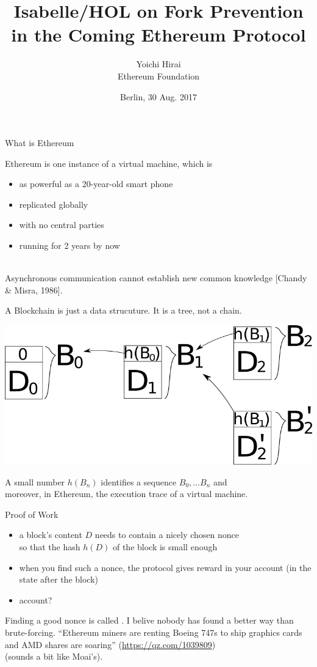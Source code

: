 \documentclass{beamer}
\title{Isabelle/HOL on Fork Prevention\\ in the Coming Ethereum Protocol}
\author{Yoichi Hirai\\ {\small Ethereum Foundation}}
\date{Berlin, 30 Aug. 2017}
\begin{document}
\begin{frame}
\titlepage
\end{frame}

\begin{frame}{What is Ethereum}

Ethereum is one instance of a virtual machine, which is
\begin{itemize}
\item as powerful as a 20-year-old smart phone
\item replicated globally
\item with no central parties
\item running for 2 years by now
\end{itemize}

\vfill

 \\
Asynchronous communication cannot establish new common knowledge [Chandy \& Misra, 1986].
\end{frame}

\begin{frame}{A Blockchain}
is just a data strucuture.  It is a tree, not a chain.

\includegraphics[width=\textwidth]{blockchains.png}

A small number $h(B_n)$ identifies a sequence $B_0, \ldots B_n$ and \\
moreover, in Ethereum, the execution trace of a virtual machine.

\end{frame}


\begin{frame}{Proof of Work}

\begin{itemize}
\item a block's content $D$ needs to contain a nicely chosen nonce\\ so that the hash $h(D)$ of the block is small enough
\item when you find such a nonce, the protocol gives reward in your account (in the state after the block)
\item account?
\end{itemize}

Finding a good nonce is called .
\vfill
I belive nobody has found a better way than brute-forcing.
\vfill
``Ethereum miners are renting Boeing 747s to ship graphics cards and AMD shares are soaring'' ({\tiny\url{https://qz.com/1039809}})\\
(sounds a bit like Moai's).
\end{frame}
\end{document}
